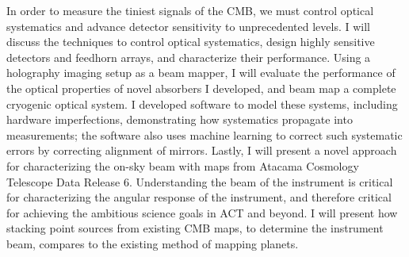 \documentclass{ucetd}
\begin{document}
In order to measure the tiniest signals of the CMB, we must control optical systematics and advance detector sensitivity to unprecedented levels. I will discuss the techniques to control optical systematics, design highly sensitive detectors and feedhorn arrays, and characterize their performance. Using a holography imaging setup as a beam mapper, I will evaluate the performance of the optical properties of novel absorbers I developed, and beam map a complete cryogenic optical system. I developed software to model these systems,  including hardware imperfections, demonstrating how systematics propagate into measurements; the software also uses machine learning to correct such systematic errors by correcting alignment of mirrors.  Lastly, I will present a novel approach for characterizing the on-sky beam with maps from Atacama Cosmology Telescope Data Release 6.  Understanding the beam of the instrument is critical for characterizing the angular response of the instrument, and therefore critical for achieving the ambitious science goals in ACT and beyond.  I will present how stacking point sources from existing CMB maps, to determine the instrument beam, compares to the existing method of mapping planets.

\mainmatter











\appendix


% 




\acknowledgments
\end{document}
